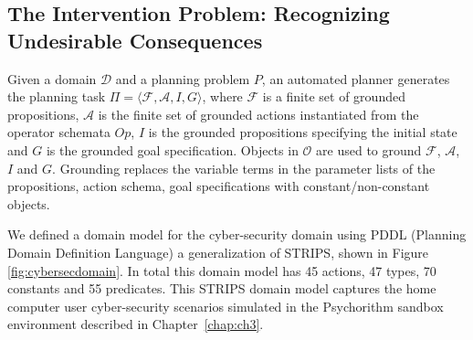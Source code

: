 \subsection{The Intervention Problem: Recognizing Undesirable Consequences}
Given a domain $\mathcal{D}$ and a planning problem $P$, an automated planner generates the planning task $\Pi=\langle \mathcal{F}, \mathcal{A}, I, G\rangle$, where $\mathcal{F}$ is a finite set of grounded propositions, $\mathcal{A}$ is the finite set of grounded actions instantiated from the operator schemata $Op$, $I$ is the grounded propositions specifying the initial state and $G$ is the grounded goal specification. Objects in $\mathcal{O}$ are used to ground $\mathcal{F}$, $\mathcal{A}$, $I$ and $G$. Grounding replaces the variable terms in the parameter lists of the propositions, action schema, goal specifications with constant/non-constant objects. 

We defined a domain model for the cyber-security domain using PDDL (Planning Domain Definition Language) a generalization of STRIPS, shown in Figure \ref{fig:cybersecdomain}. In total this domain model has 45 actions, 47 types, 70 constants and 55 predicates.
This STRIPS domain model captures the home computer user cyber-security scenarios simulated in the Psychorithm sandbox environment described in Chapter~\ref{chap:ch3}.

